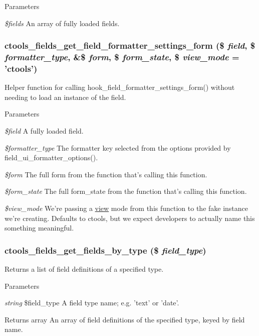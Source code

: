 \begin{DoxyParams}{Parameters}
\item[{\em \$fields}]An array of fully loaded fields. \end{DoxyParams}
\hypertarget{fields_8inc_a73335c2fc8c4ac79f671d1b7a8033a10}{
\subsubsection[{ctools\_\-fields\_\-get\_\-field\_\-formatter\_\-settings\_\-form}]{\setlength{\rightskip}{0pt plus 5cm}ctools\_\-fields\_\-get\_\-field\_\-formatter\_\-settings\_\-form (\$ {\em field}, \/  \$ {\em formatter\_\-type}, \/  \&\$ {\em form}, \/  \$ {\em form\_\-state}, \/  \$ {\em view\_\-mode} = {\ttfamily 'ctools'})}}
\label{fields_8inc_a73335c2fc8c4ac79f671d1b7a8033a10}
Helper function for calling hook\_\-field\_\-formatter\_\-settings\_\-form() without needing to load an instance of the field.


\begin{DoxyParams}{Parameters}
\item[{\em \$field}]A fully loaded field. \item[{\em \$formatter\_\-type}]The formatter key selected from the options provided by field\_\-ui\_\-formatter\_\-options(). \item[{\em \$form}]The full form from the function that's calling this function. \item[{\em \$form\_\-state}]The full form\_\-state from the function that's calling this function. \item[{\em \$view\_\-mode}]We're passing a \hyperlink{classview}{view} mode from this function to the fake instance we're creating. Defaults to ctools, but we expect developers to actually name this something meaningful. \end{DoxyParams}
\hypertarget{fields_8inc_a008f62d9ea68df7c92397fee45e5bf50}{
\subsubsection[{ctools\_\-fields\_\-get\_\-fields\_\-by\_\-type}]{\setlength{\rightskip}{0pt plus 5cm}ctools\_\-fields\_\-get\_\-fields\_\-by\_\-type (\$ {\em field\_\-type})}}
\label{fields_8inc_a008f62d9ea68df7c92397fee45e5bf50}
Returns a list of field definitions of a specified type.


\begin{DoxyParams}{Parameters}
\item[{\em string}]\$field\_\-type A field type name; e.g. 'text' or 'date'.\end{DoxyParams}
\begin{DoxyReturn}{Returns}
array An array of field definitions of the specified type, keyed by field name. 
\end{DoxyReturn}
